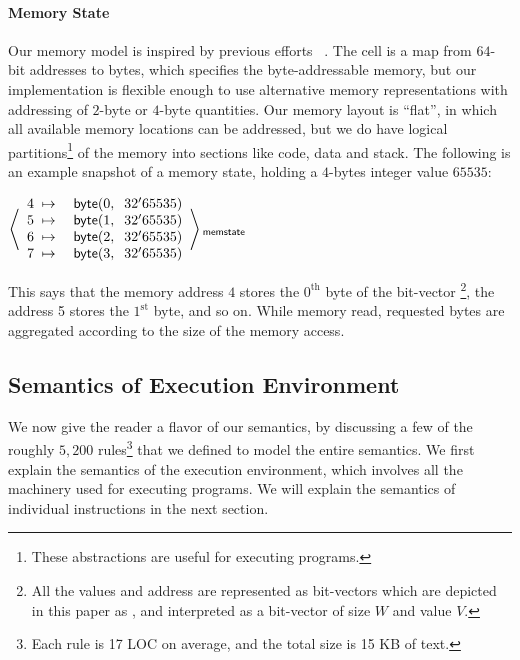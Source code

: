 \paragraph{Memory State}
Our memory model is inspired by previous efforts ~\cite{TSL:TOPLAS13, Ellison}.
The  cell is a map from $64$-bit addresses to bytes, which specifies the byte-addressable memory, but our implementation is flexible enough to use alternative memory  representations with addressing of $2$-byte or $4$-byte quantities.  Our memory layout is ``flat'', in which all available memory locations can be addressed,  but we do have logical partitions\footnote{These abstractions are useful for executing \ISA programs.} of the memory into sections like code, data and stack.  The following is an example snapshot of a memory state,  holding a $4$-bytes integer value $65535$:
\begin{center}
    \newcommand{\bytecell}[2]{\s{byte}({#1},\;\;{#2})}
    $
    \kall{memstate} {
        \begin{array}{ll}
        4 \;\mapsto\; & \bytecell{0}{32'65535}\\
        5 \;\mapsto\; & \bytecell{1}{32'65535}\\
        6 \;\mapsto\; & \bytecell{2}{32'65535}\\
        7 \;\mapsto\; & \bytecell{3}{32'65535}\\
        \end{array}
    }
    $
\end{center}
This says that the memory address $4$ stores the $0^\text{th}$ byte of the bit-vector \footnote{All the values and address are represented as bit-vectors which are depicted in this paper  as , and interpreted as a bit-vector of size $W$ and value $V$.}, the address 5 stores the $1^\text{st}$ byte, and so on. While memory read, requested bytes are aggregated according to the size of the memory access.



\subsection{Semantics of Execution Environment}
%

We now give the reader a flavor of our semantics, by discussing a few of the roughly $5,200$ rules\footnote{Each rule is 17 LOC on average, and the total size is 15 KB of text.} that we defined to model the entire semantics.
We first explain the semantics of the execution environment, which involves all the machinery used for executing \ISA programs.
We will explain the semantics of individual instructions in the next section.

